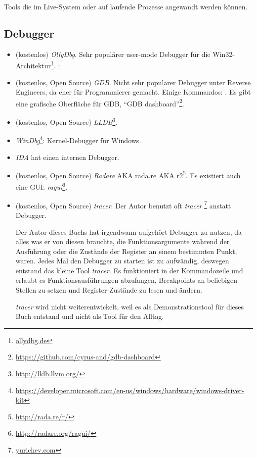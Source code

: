 
Tools die im Live-System oder auf laufende Prozesse angewandt werden können.

\subsection{Debugger}

\myindex{\olly}

\begin{itemize}
\item (kostenlos) \emph{OllyDbg}.
Sehr populärer user-mode Debugger für die Win32-Architektur\footnote{\href{http://go.yurichev.com/17032}{ollydbg.de}}.
\ShortHotKeyCheatsheet: 

\item (kostenlos, Open Source) \emph{GDB}.
Nicht sehr populärer Debugger unter Reverse Engineers, da eher für Programmierer gemacht.
Einige Kommandos: .
Es gibt eine grafische Oberfläche für GDB, ``GDB dashboard''\footnote{\url{https://github.com/cyrus-and/gdb-dashboard}}.

\item (kostenlos, Open Source) \emph{LLDB}\footnote{\url{http://lldb.llvm.org/}}.

\item \emph{WinDbg}\footnote{\url{https://developer.microsoft.com/en-us/windows/hardware/windows-driver-kit}}:
Kernel-Debugger für Windows.

\item \emph{IDA} hat einen internen Debugger.

\item (kostenlos, Open Source) \emph{Radare} \ac{AKA} rada.re \ac{AKA} r2\footnote{\url{http://rada.re/r/}}.
Es existiert auch eine GUI: \emph{ragui}\footnote{\url{http://radare.org/ragui/}}.

\item (kostenlos, Open Source) \emph{tracer}.
\label{tracer}
Der Autor benutzt oft \emph{tracer}
\footnote{\href{http://go.yurichev.com/17338}{yurichev.com}}
anstatt Debugger.

Der Autor dieses Buchs hat irgendwann aufgehört Debugger zu nutzen, da alles was er von diesen
brauchte, die Funktionsargumente während der Ausführung oder die Zustände der Register an einem
bestimmten Punkt, waren.
Jedes Mal den Debugger zu starten ist zu aufwändig, deswegen entstand das kleine Tool \emph{tracer}.
Es funktioniert in der Kommandozeile und erlaubt es Funktionsausführungen abzufangen,
Breakpoints an beliebigen Stellen zu setzen und Register-Zustände zu lesen und ändern.

\emph{tracer} wird nicht weiterentwickelt, weil es als Demonstrationstool für dieses Buch entstand
und nicht als Tool für den Alltag.
\end{itemize}

